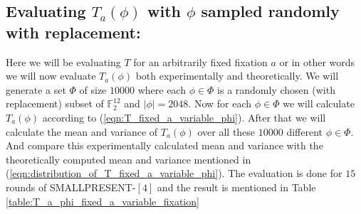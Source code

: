 \subsection{Evaluating $T_{a}\left(\phi\right)$ with $\phi$ sampled randomly with replacement:} Here we will be evaluating $T$ for an arbitrarily fixed fixation $a$ or in other words we will now evaluate $T_{a}\left(\phi\right)$ both experimentally and theoretically. We will generate a set $\Phi$ of size $10000$ where each $\phi \in \Phi$ is a randomly chosen (with replacement) subset of  $\mathbb{F}_2^{12}$ and $|\phi| = 2048$. Now for each $\phi \in \Phi$ we will calculate $T_{a}\left(\phi\right)$ according to (\ref{eqn:T_fixed_a_variable_phi}). After that we will calculate the mean and variance of $T_{a}\left(\phi\right)$ over all these $10000$ different $\phi \in \Phi$. And compare this experimentally calculated mean and variance with the theoretically computed mean and variance mentioned in (\ref{eqn:distribution_of_T_fixed_a_variable_phi}). The evaluation is done for $15$ rounds of SMALLPRESENT-$[4]$ and the result is mentioned in Table \ref{table:T_a_phi_fixed_a_variable_fixation}


